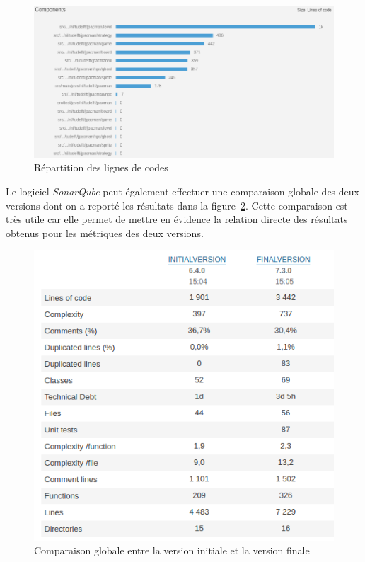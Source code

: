 \documentclass[12pt, openany]{report}
\begin{document}
\begin{figure}[!h]
	\centering
	\includegraphics[scale=0.5]{Images/sonarFinale4.png} 
	\caption{Répartition des lignes de codes}
	\label{sonarFinal4}
\end{figure} 


\newpage

Le logiciel \textit{SonarQube} peut également effectuer une comparaison globale des deux versions dont on a reporté les résultats dans la figure~\ref{sonarComparaison}. Cette comparaison est très utile car elle permet de mettre en évidence la relation directe des résultats obtenus pour les métriques des deux versions.

\begin{figure}[!h]
	\centering
	\includegraphics[scale=0.5]{Images/sonarcompar.png} 
	\caption{Comparaison globale entre la version initiale et la version finale}
	\label{sonarComparaison}
\end{figure} 
\end{document}
